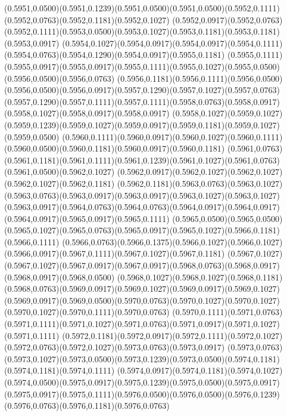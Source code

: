 (0.5951,0.0500)(0.5951,0.1239)(0.5951,0.0500)(0.5951,0.0500)(0.5952,0.1111)(0.5952,0.0763)(0.5952,0.1181)(0.5952,0.1027)
(0.5952,0.0917)(0.5952,0.0763)(0.5952,0.1111)(0.5953,0.0500)(0.5953,0.1027)(0.5953,0.1181)(0.5953,0.1181)(0.5953,0.0917)
(0.5954,0.1027)(0.5954,0.0917)(0.5954,0.0917)(0.5954,0.1111)(0.5954,0.0763)(0.5954,0.1290)(0.5954,0.0917)(0.5955,0.1181)
(0.5955,0.1111)(0.5955,0.0917)(0.5955,0.0917)(0.5955,0.1111)(0.5955,0.1027)(0.5955,0.0500)(0.5956,0.0500)(0.5956,0.0763)
(0.5956,0.1181)(0.5956,0.1111)(0.5956,0.0500)(0.5956,0.0500)(0.5956,0.0917)(0.5957,0.1290)(0.5957,0.1027)(0.5957,0.0763)
(0.5957,0.1290)(0.5957,0.1111)(0.5957,0.1111)(0.5958,0.0763)(0.5958,0.0917)(0.5958,0.1027)(0.5958,0.0917)(0.5958,0.0917)
(0.5958,0.1027)(0.5959,0.1027)(0.5959,0.1239)(0.5959,0.1027)(0.5959,0.0917)(0.5959,0.1181)(0.5959,0.1027)(0.5959,0.0500)
(0.5960,0.1111)(0.5960,0.0917)(0.5960,0.1027)(0.5960,0.1111)(0.5960,0.0500)(0.5960,0.1181)(0.5960,0.0917)(0.5960,0.1181)
(0.5961,0.0763)(0.5961,0.1181)(0.5961,0.1111)(0.5961,0.1239)(0.5961,0.1027)(0.5961,0.0763)(0.5961,0.0500)(0.5962,0.1027)
(0.5962,0.0917)(0.5962,0.1027)(0.5962,0.1027)(0.5962,0.1027)(0.5962,0.1181)
\PST@Solid(0.5962,0.1181)(0.5963,0.0763)(0.5963,0.1027)(0.5963,0.0763)(0.5963,0.0917)(0.5963,0.0917)(0.5963,0.1027)(0.5963,0.1027)
(0.5963,0.0917)(0.5964,0.0763)(0.5964,0.0763)(0.5964,0.0917)(0.5964,0.0917)(0.5964,0.0917)(0.5965,0.0917)(0.5965,0.1111)
(0.5965,0.0500)(0.5965,0.0500)(0.5965,0.1027)(0.5965,0.0763)(0.5965,0.0917)(0.5965,0.1027)(0.5966,0.1181)(0.5966,0.1111)
(0.5966,0.0763)(0.5966,0.1375)(0.5966,0.1027)(0.5966,0.1027)(0.5966,0.0917)(0.5967,0.1111)(0.5967,0.1027)(0.5967,0.1181)
(0.5967,0.1027)(0.5967,0.1027)(0.5967,0.0917)(0.5967,0.0917)(0.5968,0.0763)(0.5968,0.0917)(0.5968,0.0917)(0.5968,0.0500)
(0.5968,0.1027)(0.5968,0.1027)(0.5968,0.1181)(0.5968,0.0763)(0.5969,0.0917)(0.5969,0.1027)(0.5969,0.0917)(0.5969,0.1027)
(0.5969,0.0917)(0.5969,0.0500)(0.5970,0.0763)(0.5970,0.1027)(0.5970,0.1027)(0.5970,0.1027)(0.5970,0.1111)(0.5970,0.0763)
(0.5970,0.1111)(0.5971,0.0763)(0.5971,0.1111)(0.5971,0.1027)(0.5971,0.0763)(0.5971,0.0917)(0.5971,0.1027)(0.5971,0.1111)
(0.5972,0.1181)(0.5972,0.0917)(0.5972,0.1111)(0.5972,0.1027)(0.5972,0.0763)(0.5972,0.1027)(0.5973,0.0763)(0.5973,0.0917)
(0.5973,0.0763)(0.5973,0.1027)(0.5973,0.0500)(0.5973,0.1239)(0.5973,0.0500)(0.5974,0.1181)(0.5974,0.1181)(0.5974,0.1111)
(0.5974,0.0917)(0.5974,0.1181)(0.5974,0.1027)(0.5974,0.0500)(0.5975,0.0917)(0.5975,0.1239)(0.5975,0.0500)(0.5975,0.0917)
(0.5975,0.0917)(0.5975,0.1111)(0.5976,0.0500)(0.5976,0.0500)(0.5976,0.1239)(0.5976,0.0763)(0.5976,0.1181)(0.5976,0.0763)

